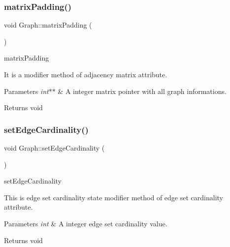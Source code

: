 \subsubsection{\texorpdfstring{matrix\+Padding()}{matrixPadding()}}
{\footnotesize\ttfamily void Graph\+::matrix\+Padding (\begin{DoxyParamCaption}\item[{int $\ast$$\ast$}]{ }\end{DoxyParamCaption})}



matrix\+Padding 

It is a modifier method of adjacency matrix attribute.


\begin{DoxyParams}{Parameters}
{\em int$\ast$$\ast$} & A integer matrix pointer with all graph informations. \\
\hline
\end{DoxyParams}
\begin{DoxyReturn}{Returns}
void 
\end{DoxyReturn}
\mbox{\label{classGraph_af7d5f5330b09c20ad08fc181fb7f5655}} 
\subsubsection{\texorpdfstring{set\+Edge\+Cardinality()}{setEdgeCardinality()}}
{\footnotesize\ttfamily void Graph\+::set\+Edge\+Cardinality (\begin{DoxyParamCaption}\item[{int}]{ }\end{DoxyParamCaption})}



set\+Edge\+Cardinality 

This is edge set cardinality state modifier method of edge set cardinality attribute.


\begin{DoxyParams}{Parameters}
{\em int} & A integer edge set cardinality value. \\
\hline
\end{DoxyParams}
\begin{DoxyReturn}{Returns}
void 
\end{DoxyReturn}
\mbox{\label{classGraph_a6d74237b1877d78469273c256bc9392f}} 
